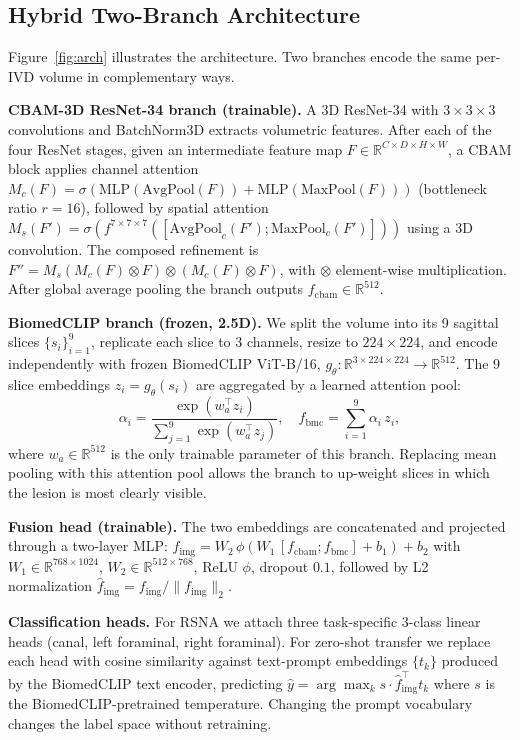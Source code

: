 \documentclass[runningheads]{llncs}
\begin{document}
\subsection{Hybrid Two-Branch Architecture}

Figure~\ref{fig:arch} illustrates the architecture. Two branches encode
the same per-IVD volume in complementary ways.

\textbf{CBAM-3D ResNet-34 branch (trainable).}
A 3D ResNet-34 with $3\!\times\!3\!\times\!3$ convolutions and BatchNorm3D
extracts volumetric features. After each of the four ResNet stages, given
an intermediate feature map
$F \in \mathbb{R}^{C \times D \times H \times W}$, a CBAM block
applies channel attention $M_c(F) = \sigma(\text{MLP}(\text{AvgPool}(F))
+ \text{MLP}(\text{MaxPool}(F)))$ (bottleneck ratio $r=16$),
followed by spatial attention $M_s(F') = \sigma(f^{7 \times 7
\times 7}([\text{AvgPool}_c(F'); \text{MaxPool}_c(F')]))$ using a
3D convolution. The composed refinement is $F'' = M_s(M_c(F) \otimes
F) \otimes (M_c(F) \otimes F)$, with $\otimes$ element-wise
multiplication. After global average pooling the branch outputs
$f_{\text{cbam}} \in \mathbb{R}^{512}$.

\textbf{BiomedCLIP branch (frozen, 2.5D).}
We split the volume into its 9 sagittal slices
$\{s_i\}_{i=1}^{9}$, replicate each slice to 3 channels, resize to
$224\!\times\!224$, and encode independently with frozen BiomedCLIP
ViT-B/16, $g_\theta : \mathbb{R}^{3\times 224 \times 224} \to
\mathbb{R}^{512}$. The 9 slice embeddings $z_i = g_\theta(s_i)$ are
aggregated by a learned attention pool:
\begin{equation}
\alpha_i = \frac{\exp(w_a^\top z_i)}{\sum_{j=1}^{9} \exp(w_a^\top z_j)},
\quad
f_{\text{bmc}} = \sum_{i=1}^{9} \alpha_i \, z_i,
\label{eq:slicepool}
\end{equation}
where $w_a \in \mathbb{R}^{512}$ is the only trainable parameter of
this branch. Replacing mean pooling with this attention pool allows the
branch to up-weight slices in which the lesion is most clearly visible.

\textbf{Fusion head (trainable).}
The two embeddings are concatenated and projected through a two-layer
MLP: $f_{\text{img}} = W_2\,\phi(W_1\,[f_{\text{cbam}};f_{\text{bmc}}]
+ b_1) + b_2$ with $W_1 \in \mathbb{R}^{768 \times 1024}$,
$W_2 \in \mathbb{R}^{512 \times 768}$, ReLU $\phi$, dropout $0.1$,
followed by L2 normalization $\hat{f}_{\text{img}} = f_{\text{img}}
/ \|f_{\text{img}}\|_2$.

\textbf{Classification heads.}
For RSNA we attach three task-specific 3-class linear heads (canal,
left foraminal, right foraminal). For zero-shot transfer we replace
each head with cosine similarity against text-prompt embeddings
$\{t_k\}$ produced by the BiomedCLIP text encoder, predicting
$\hat{y} = \arg\max_{k} s \cdot \hat{f}_{\text{img}}^{\top} t_k$
where $s$ is the BiomedCLIP-pretrained temperature. Changing the
prompt vocabulary changes the label space without retraining.
\end{document}
